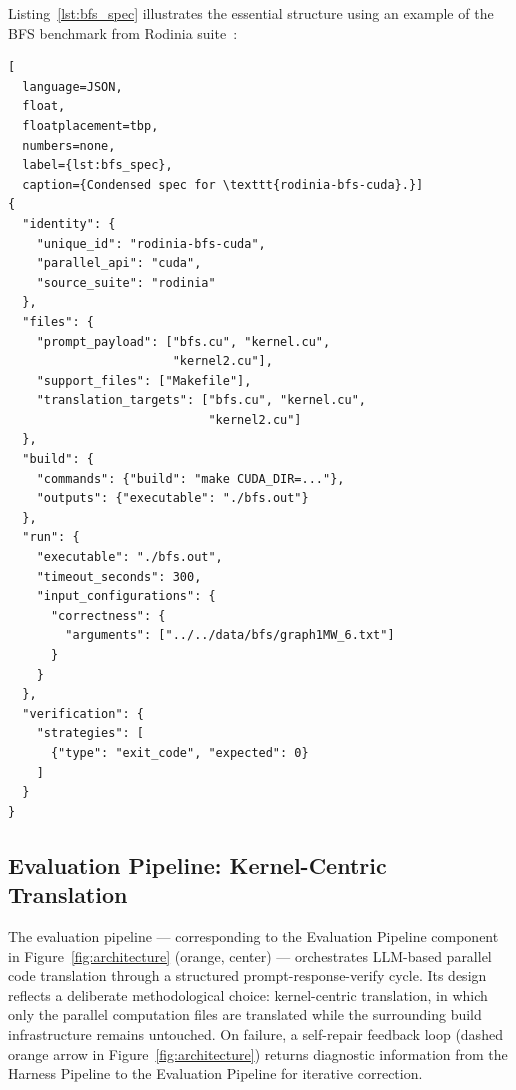 \documentclass{article}
\begin{document}
Listing~\ref{lst:bfs_spec} illustrates the essential structure using an example of the BFS benchmark from Rodinia suite~\cite{Rodinia2009}:

\begin{lstlisting}[
  language=JSON,
  float,
  floatplacement=tbp,
  numbers=none,
  label={lst:bfs_spec},
  caption={Condensed spec for \texttt{rodinia-bfs-cuda}.}]
{
  "identity": {
    "unique_id": "rodinia-bfs-cuda",
    "parallel_api": "cuda",
    "source_suite": "rodinia"
  },
  "files": {
    "prompt_payload": ["bfs.cu", "kernel.cu",
                       "kernel2.cu"],
    "support_files": ["Makefile"],
    "translation_targets": ["bfs.cu", "kernel.cu",
                            "kernel2.cu"]
  },
  "build": {
    "commands": {"build": "make CUDA_DIR=..."},
    "outputs": {"executable": "./bfs.out"}
  },
  "run": {
    "executable": "./bfs.out",
    "timeout_seconds": 300,
    "input_configurations": {
      "correctness": {
        "arguments": ["../../data/bfs/graph1MW_6.txt"]
      }
    }
  },
  "verification": {
    "strategies": [
      {"type": "exit_code", "expected": 0}
    ]
  }
}
\end{lstlisting}

\subsection{Evaluation Pipeline: Kernel-Centric Translation}
\label{sec:eval-pipeline}

The evaluation pipeline --- corresponding to the Evaluation Pipeline component in Figure~\ref{fig:architecture} (orange, center) --- orchestrates LLM-based parallel code translation through a structured prompt-response-verify cycle. Its design reflects a deliberate methodological choice: kernel-centric translation, in which only the parallel computation files are translated while the surrounding build infrastructure remains untouched. On failure, a self-repair feedback loop (dashed orange arrow in Figure~\ref{fig:architecture}) returns diagnostic information from the Harness Pipeline to the Evaluation Pipeline for iterative correction.
\end{document}
